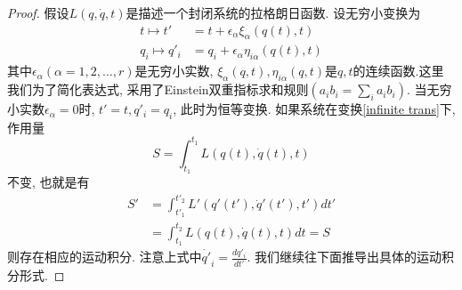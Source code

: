 \documentclass[a4paper,11pt]{article}
\newtheorem{proof}{证明}[section]
\begin{document}
\begin{proof}
  假设$L(q,\dot{q},t)$是描述一个封闭系统的拉格朗日函数. 设无穷小变换为
  \begin{equation}\label{infinite trans}
  \begin{split}
     t\mapsto t'&=t+\epsilon_\alpha\xi_\alpha(q(t),t) \\
       q_i\mapsto q'_i&=q_i+\epsilon_\alpha\eta_{i\alpha}(q(t),t)
  \end{split}
  \end{equation}
  其中$\epsilon_\alpha(\alpha=1,2,\dots,r)$是无穷小实数, $\xi_\alpha(q,t),\eta_{i\alpha}(q,t)$是$q,t$的连续函数.这里我们为了简化表达式, 采用了Einstein双重指标求和规则$(a_i b_i=\sum_{i}a_i b_i)$. 当无穷小实数$\epsilon_\alpha=0$时, $t'=t,q'_i=q_i$, 此时为恒等变换. 如果系统在变换\eqref{infinite trans}下, 作用量
  \begin{equation}\label{action inv inf}
    S=\int_{t_1}^{t_1}L(q(t),\dot{q}(t),t)
  \end{equation}
  不变, 也就是有
  \begin{equation*}
  \begin{split}
     S'&=\int_{t'_1}^{t'_2}L'(q'(t'),\dot{q}'(t'),t')dt' \\
       &=\int_{t_1}^{t_2}L(q(t),\dot{q}(t),t)dt=S
  \end{split}
  \end{equation*}
  则存在相应的运动积分. 注意上式中$\dot{q'}_i=\frac{d{q'_i}}{dt'}$. 我们继续往下面推导出具体的运动积分形式.


\end{proof}
\end{document}
